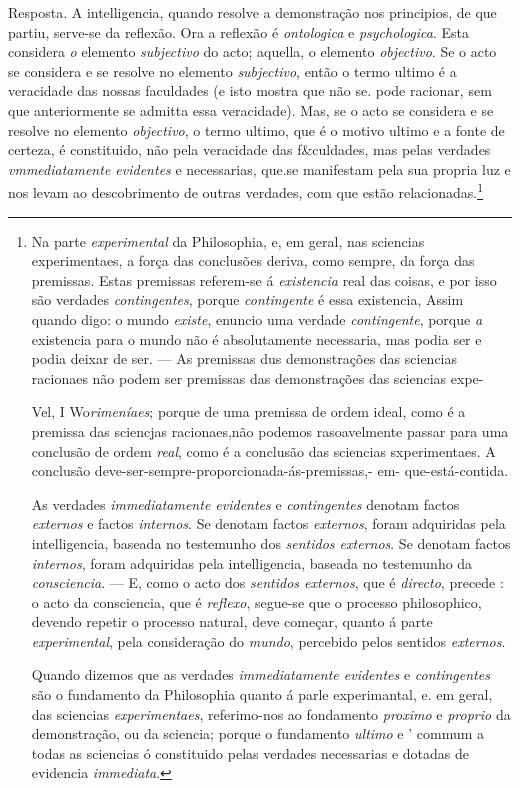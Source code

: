 Resposta. A intelligencia, quando resolve a demonstração nos principios, de que partiu, serve-se da reflexão. Ora a reflexão é \emph{ontologica} e \emph{psychologica}. Esta considera \emph{o} elemento \emph{subjectivo} do acto; aquella, o elemento \emph{objectivo}. Se o acto se considera e se resolve no elemento \emph{subjectivo}, então o termo ultimo é a veracidade das nossas faculdades (e isto mostra que não se. pode racionar, sem que anteriormente se admitta essa veracidade). Mas, se o acto se considera e se resolve no elemento \emph{objectivo}, o termo ultimo, que é o motivo ultimo e a fonte de certeza, é constituido, não pela veracidade das f\&culdades, mas pelas verdades \emph{vmmediatamente evidentes} e necessarias, que.se manifestam pela sua propria luz e nos levam ao descobrimento de outras verdades, com que estão relacionadas.\footnote{Na parte \emph{experimental} da Philosophia, e, em geral, nas sciencias experimentaes, a força das conclusões deriva, como sempre, da força das premissas. Estas premissas referem-se á \emph{existencia} real das coisas, e por isso são verdades \emph{contingentes}, porque \emph{contingente} é essa existencia, Assim quando digo: o mundo \emph{existe}, enuncio uma verdade \emph{contingente}, porque \emph{a} existencia para o mundo não é absolutamente necessaria, mas podia ser e podia deixar de ser. --- As premissas dus demonstrações das sciencias racionaes não podem ser premissas das demonstrações das sciencias expe-\par Vel, I Wo\emph{rimeníaes}; porque de uma premissa de ordem ideal, como é a premissa das sciencjas racionaes,não podemos rasoavelmente passar para uma conclusão de ordem \emph{real}, como é a conclusão das sciencias sxperimentaes. A conclusão deve-ser-sempre-proporcionada-ás-premissas,- em- que-está-contida.\par As verdades \emph{immediatamente evidentes} e \emph{contingentes} denotam factos \emph{externos} e factos \emph{internos}. Se denotam factos \emph{externos}, foram adquiridas pela intelligencia, baseada no testemunho dos \emph{sentidos externos}. Se denotam factos \emph{internos}, foram adquiridas pela intelligencia, baseada no testemunho da \emph{consciencia}. --- E, como o acto dos \emph{sentidos externos}, que é \emph{directo}, precede : o acto da consciencia, que é \emph{reflexo}, segue-se que o processo philosophico, devendo repetir o processo natural, deve começar, quanto á parte \emph{experimental}, pela consideração do \emph{mundo}, percebido pelos sentidos \emph{externos}.\par Quando dizemos que as verdades \emph{immediatamente evidentes} e \emph{contingentes} são o fundamento da Philosophia quanto á parle experimantal, e. em geral, das sciencias \emph{experimentaes}, referimo-nos ao fondamento \emph{proximo} e \emph{proprio} da demonstração, ou da sciencia; porque o fundamento \emph{ultimo} e ' commum a todas as sciencias ó constituido pelas verdades necessarias e dotadas de evidencia \emph{immediata}.}

